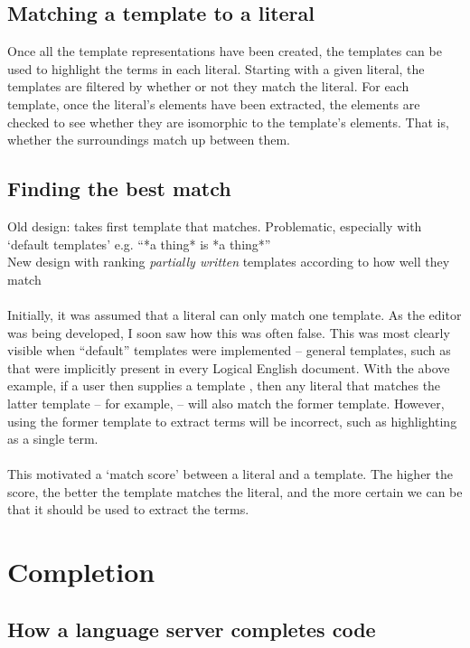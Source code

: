 \documentclass[../main.tex]{subfiles}
\begin{document}
\subsection{Matching a template to a literal}
Once all the template representations have been created, the templates can be used to highlight the terms in each literal. Starting with a given literal, the templates are filtered by whether or not they match the literal. 
For each template, once the literal's elements have been extracted, the elements are checked to see whether they are isomorphic to the template's elements. That is, whether the surroundings match up between them.

\subsection{Finding the best match}
Old design: takes first template that matches. Problematic, especially with `default templates' e.g. ``*a thing* is *a thing*''
\\
New design with ranking \textit{partially written} templates according to how well they match
\\
\\
Initially, it was assumed that a literal can only match one template. As the editor was being developed, I soon saw how this was often false. This was most clearly visible when ``default'' templates were implemented -- general templates, such as  that were implicitly present in every Logical English document. With the above example, if a user then supplies a template , then any literal that matches the latter template -- for example,  -- will also match the former template. However, using the former template to extract terms will be incorrect, such as highlighting  as a single term.
\\ 
\\
This motivated a `match score' between a literal and a template. The higher the score, the better the template matches the literal, and the more certain we can be that it should be used to extract the terms.
%
%
%
\section{Completion}
\subsection{How a language server completes code}
\end{document}
